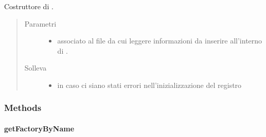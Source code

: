 \documentclass[letterpaper,10pt,italian,openany,oneside]{sphinxmanual}
\begin{document}
\begin{fulllineitems}
\label{\detokenize{source/it/unicam/cs/pa/mastermind/factories/PlayerFactoryRegistry:it.unicam.cs.pa.mastermind.factories.PlayerFactoryRegistry.PlayerFactoryRegistry(String)}}
Costruttore di .
\begin{quote}\begin{description}
\item[{Parametri}] \leavevmode\begin{itemize}
\item {} 
 \textendash{} associato al file da cui leggere informazioni da inserire all’interno di .

\end{itemize}

\item[{Solleva}] \leavevmode\begin{itemize}
\item {} 
 \textendash{} in caso ci siano stati errori nell’inizializzazione del registro

\end{itemize}

\end{description}\end{quote}

\end{fulllineitems}



\subsubsection{Methods}
\label{\detokenize{source/it/unicam/cs/pa/mastermind/factories/PlayerFactoryRegistry:methods}}

\paragraph{getFactoryByName}
\label{\detokenize{source/it/unicam/cs/pa/mastermind/factories/PlayerFactoryRegistry:getfactorybyname}}
\end{document}
